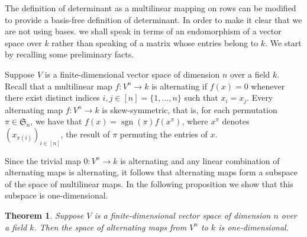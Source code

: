 \documentclass[12pt]{article}
\DeclareMathOperator{\sgn}{sgn}
\newtheorem*{proposition*}{Theorem}
\begin{document}
The definition of determinant as a multilinear mapping on rows can be
modified to provide a basis-free definition of determinant.  In order
to make it clear that we are not using bases. we shall speak in terms
of an endomorphism of a vector space over $k$ rather than speaking of
a matrix whose entries belong to $k$.  We start by recalling some
preliminary facts.

Suppose $V$ is a finite-dimensional vector space of dimension $n$ over
a field $k$.  Recall that a multilinear map $f\colon V^n\to k$ is
alternating if $f(x) = 0$ whenever there exist distinct indices
$i,j\in[n]=\{1,\dots,n\}$ such that $x_i = x_j$.  Every alternating
map $f\colon V^n\to k$ is skew-symmetric, that is, for each
permutation $\pi\in\mathfrak{S}_n$, we have that $f(x) =
\sgn(\pi)f(x^{\pi})$, where $x^{\pi}$ denotes
$(x_{\pi(i)})_{i\in[n]}$, the result of $\pi$ permuting the entries of
$x$.

Since the trivial map $0\colon V^n\to k$ is alternating and any linear
combination of alternating maps is alternating, it follows that
alternating maps form a subspace of the space of multilinear maps.  In
the following proposition we show that this subspace is
one-dimensional.  

\begin{proposition*}
Suppose $V$ is a finite-dimensional vector space of dimension $n$ over
a field $k$.  Then the space of alternating maps from $V^n$ to $k$ is
one-dimensional.
\end{proposition*}
\end{document}
